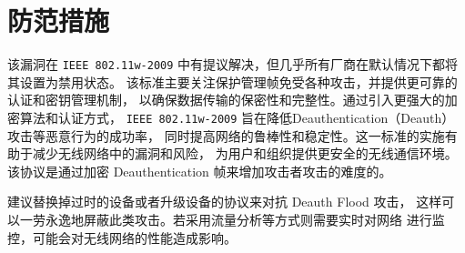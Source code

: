 \documentclass[../main.tex]{subfiles}
\begin{document}
\section{防范措施}
该漏洞在 \texttt{IEEE 802.11w-2009} 中有提议解决，但几乎所有厂商在默认情况下都将其设置为禁用状态。
该标准主要关注保护管理帧免受各种攻击，并提供更可靠的认证和密钥管理机制，
以确保数据传输的保密性和完整性。通过引入更强大的加密算法和认证方式，
\texttt{IEEE 802.11w-2009} 旨在降低Deauthentication（Deauth）攻击等恶意行为的成功率，
同时提高网络的鲁棒性和稳定性。这一标准的实施有助于减少无线网络中的漏洞和风险，
为用户和组织提供更安全的无线通信环境。
该协议是通过加密 Deauthentication 帧来增加攻击者攻击的难度的。

建议替换掉过时的设备或者升级设备的协议来对抗 Deauth Flood 攻击，
这样可以一劳永逸地屏蔽此类攻击。若采用流量分析等方式则需要实时对网络
进行监控，可能会对无线网络的性能造成影响。
\end{document}
